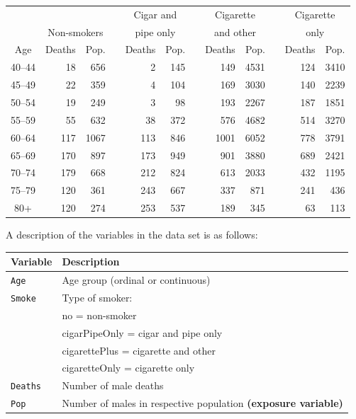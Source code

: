 \documentclass[11pt,a4paper]{article}
\begin{document}
\begin{center}
    \begin{tabular}{crrcrrcrrcrr}
        \hline
            & \multicolumn{2}{c}{}            && \multicolumn{2}{c}{Cigar and} && \multicolumn{2}{c}{Cigarette} && \multicolumn{2}{c}{Cigarette}\\
            & \multicolumn{2}{c}{Non-smokers} && \multicolumn{2}{c}{pipe only} && \multicolumn{2}{c}{and other} && \multicolumn{2}{c}{only}\\
        \cline{2-3}
        \cline{5-6}
        \cline{8-9}
        \cline{11-12}
        Age & Deaths & Pop. && Deaths & Pop. && Deaths & Pop. && Deaths & Pop.\\
        \hline
        40--44 &  18 &  656 &&   2 & 145 &&  149 & 4531 && 124 & 3410\\
        45--49 &  22 &  359 &&   4 & 104 &&  169 & 3030 && 140 & 2239\\
        50--54 &  19 &  249 &&   3 &  98 &&  193 & 2267 && 187 & 1851\\
        55--59 &  55 &  632 &&  38 & 372 &&  576 & 4682 && 514 & 3270\\
        60--64 & 117 & 1067 && 113 & 846 && 1001 & 6052 && 778 & 3791\\
        65--69 & 170 &  897 && 173 & 949 &&  901 & 3880 && 689 & 2421\\
        70--74 & 179 &  668 && 212 & 824 &&  613 & 2033 && 432 & 1195\\
        75--79 & 120 &  361 && 243 & 667 &&  337 &  871 && 241 &  436\\
        80+    & 120 &  274 && 253 & 537 &&  189 &  345 &&  63 &  113\\
        \hline
    \end{tabular}
\end{center}

A description of the variables in the data set is as follows:
\begin{center}
    \begin{tabular}{ll}
        \hline
        \textbf{Variable}   & \textbf{Description}\\
        \hline
        \texttt{Age}        & Age group (ordinal or continuous)\\
        \texttt{Smoke}      & Type of smoker: \\
                            & no = non-smoker\\
                            & cigarPipeOnly = cigar and pipe only\\
                            & cigarettePlus = cigarette and other\\
                            & cigaretteOnly = cigarette only\\
        \texttt{Deaths}     & Number of male deaths\\
        \texttt{Pop}        & Number of males in respective population \textbf{(exposure variable)}\\
        \hline
    \end{tabular}
\end{center}
\end{document}
